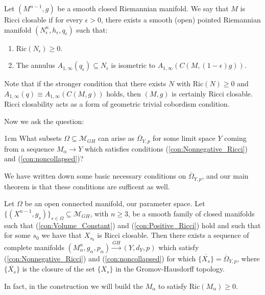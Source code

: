 \documentclass[11pt]{article}
\newcommand{\Ric}{\text{Ric}}
\newcommand{\cM}{\mathcal{M}}
\begin{document}
\begin{definition}\label{d:closeable}
Let $(M^{n-1},g)$ be a smooth closed Riemannian manifold.  We say that $M$ is Ricci closable if for every $\epsilon>0$, there exists a smooth (open) pointed Riemannian manifold $(N^n_\epsilon,h_\epsilon,q_\epsilon)$ such that:
\begin{enumerate}
 \item $\Ric(N_\epsilon)\geq 0$.
 \item The annulus $A_{1,\infty}(q_\epsilon)\subseteq N_\epsilon$ is isometric to $A_{1,\infty}(C(M,(1-\epsilon)g))$.
\end{enumerate}
\end{definition}
\begin{remark}
Note that if the stronger condition that there exists $N$ with $\Ric(N)\geq 0$ and $A_{1,\infty}(q)\equiv A_{1,\infty}(C(M,g))$ holds, then $(M,g)$ is certainly Ricci closable.  Ricci closability acts as a form of geometric trivial cobordism condition.
\end{remark}


Now we ask the question:  
\begin{myindentpar}{1cm}
What subsets $\Omega\subseteq \cM_{GH}$ can arise as $\overline\Omega_{Y,p}$ for some limit space $Y$ coming from a sequence $M_\alpha\rightarrow Y$ which satisfies conditions (\ref{con:Nonnegative_Ricci}) and (\ref{con:noncollapsed})?
\end{myindentpar}
We have written down some basic necessary conditions on $\overline\Omega_{Y,p}$, and our main theorem is that these conditions are sufficent as well.

\begin{theorem}\label{t:Smooth_Section_Existence}
Let $\Omega$ be an open connected manifold, our parameter space.  Let $\{(X^{n-1},g_s)\}_{s\in\Omega}\subseteq \cM_{GH}$, with $n\geq 3$, be a smooth family of closed manifolds such that (\ref{con:Volume_Constant}) and (\ref{con:Positive_Ricci}) hold and such that for some $s_0$ we have that $X_{s_0}$ is Ricci closable.  Then there exists a sequence of complete manifolds $(M^n_\alpha,g_\alpha,p_\alpha)\stackrel{GH}{\rightarrow} (Y,d_Y,p)$ which satisfy (\ref{con:Nonnegative_Ricci}) and (\ref{con:noncollapsed}) for which $\overline{\{X_s\}} = \overline\Omega_{Y,p}$, where $\overline{\{X_s\}}$ is the closure of the set $\{X_s\}$ in the Gromov-Hausdorff topology.
\end{theorem}

\begin{remark}
 In fact, in the construction we will build the $M_\alpha$ to satisfy $\Ric(M_\alpha)\geq 0$.
\end{remark}
\end{document}
